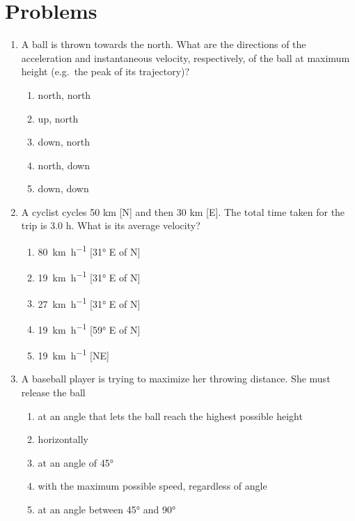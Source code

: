 %
%
%
%

\newpage
\section*{Problems}

\begin{multicols}{2}
  \begin{enumerate}[leftmargin=12pt]
  \item A ball is thrown towards the north. What are the directions of the
    acceleration and instantaneous velocity, respectively, of the ball at
    maximum height (e.g.\ the peak of its trajectory)?
    \begin{enumerate}[noitemsep]
    \item north, north
    \item up, north
    \item down, north
    \item north, down
    \item down, down
    \end{enumerate}

  \item A cyclist cycles 50 km [N] and then 30 km [E]. The total time taken
    for the trip is 3.0 h. What is its average velocity?
    \begin{enumerate}[noitemsep]
    \item\SI{80}{\kilo\metre\per\hour} [\ang{31} E of N]
    \item\SI{19}{\kilo\metre\per\hour} [\ang{31} E of N]
    \item\SI{27}{\kilo\metre\per\hour} [\ang{31} E of N]
    \item\SI{19}{\kilo\metre\per\hour} [\ang{59} E of N]
    \item\SI{19}{\kilo\metre\per\hour} [NE]
    \end{enumerate}

  \item A baseball player is trying to maximize her throwing distance. She
    must release the ball \underline{\hspace{.7in}}
    \begin{enumerate}[noitemsep]
    \item at an angle that lets the ball reach the highest possible height
    \item horizontally
    \item at an angle of \ang{45}
    \item with the maximum possible speed, regardless of angle
    \item at an angle between \ang{45} and \ang{90}
    \end{enumerate}


\end{enumerate}
\end{multicols}
